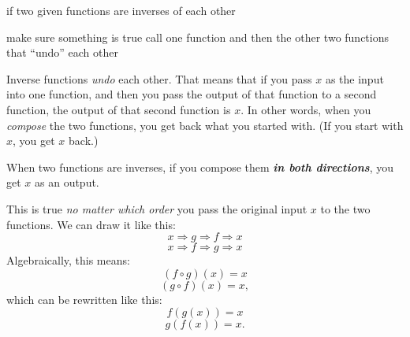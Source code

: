 \documentclass[fleqn,letterpaper,12pt,printwatermark=false]{memoir}
\begin{document}
\newcommand{\myClassName}{Pre-AP Algebra 2}
\newcommand{\myUnitNumber}{1}
\newcommand{\myUnitTitle}{Introduction to Functions}
\newcommand{\myLessonNumber}{11}
\newcommand{\myLessonTitle}{Verifying Inverses}


\pagestyle{myPagestyle}

\checkandfixthelayout
{}

\begin{myNotesHeader}
    \item {} if two given functions are inverses of each other
\end{myNotesHeader}

\begin{myVocabulary}
        {
            make sure something is true
        }
        {
            call one function and then the other
        }
        {
            two functions that ``undo'' each other
        }
\end{myVocabulary}

\begin{myLesson}
    Inverse functions \emph{undo} each other.
    That means that if you pass $x$ as the input into one function,
    and then you pass the output of that function to a second function,
    the output of that second function is $x$.
    In other words,
    when you \emph{compose} the two functions,
    you get back what you started with.
    (If you start with $x$, you get $x$ back.)

    \begin{myLessonBox}
        When two functions are inverses,
        if you compose them 
        {\bfseries\itshape in both directions},
        you get $x$ as an output.
    \end{myLessonBox}

    This is true 
    \emph{no matter which order} you pass the original input $x$
    to the two functions.
    We can draw it like this:
    \[
        x 
        \Longrightarrow 
        g 
        \Longrightarrow 
        f
        \Longrightarrow 
        x
    \]
    \[
        x 
        \Longrightarrow 
        f 
        \Longrightarrow 
        g 
        \Longrightarrow 
        x
    \]
    Algebraically, this means:
    \[
        (f \circ g)(x) = x
    \]
    \[
        (g \circ f)(x) = x,
    \]
    which can be rewritten like this:
    \[
        f(g(x)) = x
    \]
    \[
        g(f(x)) = x.
    \]
\end{myLesson}
\end{document}
